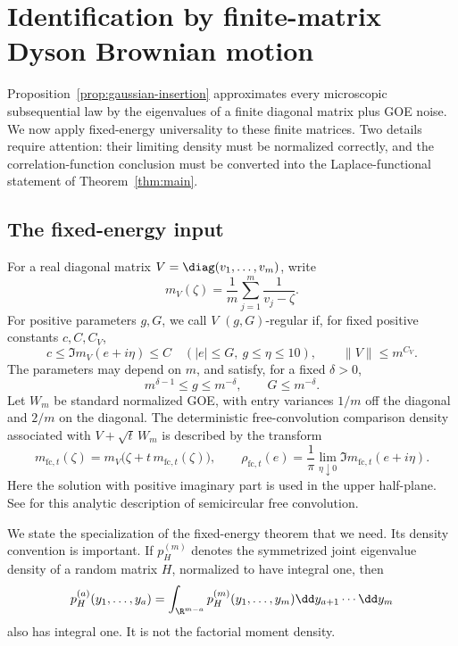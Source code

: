 \section{Identification by finite-matrix Dyson Brownian motion}
\label{sec:dbm}

Proposition~\ref{prop:gaussian-insertion} approximates every microscopic
subsequential law by the eigenvalues of a finite diagonal matrix plus GOE
noise. We now apply fixed-energy universality to these finite matrices.
Two details require attention: their limiting density must be normalized
correctly, and the correlation-function conclusion must be converted into
the Laplace-functional statement of Theorem~\ref{thm:main}.

\subsection{The fixed-energy input}

For a real diagonal matrix \(V=\diag(v_1,\ldots,v_m)\), write
\[
 m_V(\zeta)=\frac1m\sum_{j=1}^m\frac1{v_j-\zeta}.
\]
For positive parameters \(g,G\), we call \(V\) \((g,G)\)-regular
if, for fixed positive constants
\(c,C,C_V\),
\begin{equation}
 \label{eq:dbm-regularity}
 c\le \Im m_V(e+i\eta)\le C
 \quad (|e|\le G,\ g\le\eta\le10),
 \qquad \|V\|\le m^{C_V}.
\end{equation}
The parameters may depend on \(m\), and satisfy, for a fixed
\(\delta>0\),
\begin{equation}
 \label{eq:dbm-parameter-domain}
 m^{\delta-1}\le g\le m^{-\delta},
 \qquad G\le m^{-\delta}.
\end{equation}
Let \(W_m\) be standard normalized GOE, with entry variances \(1/m\)
off the diagonal and \(2/m\) on the diagonal. The deterministic
free-convolution comparison density associated with
\(V+\sqrt t\,W_m\) is described by the transform
\begin{equation}
 \label{eq:dbm-free-convolution}
 m_{\mathrm{fc},t}(\zeta)
   =m_V\bigl(\zeta+t\,m_{\mathrm{fc},t}(\zeta)\bigr),
 \qquad
 \rho_{\mathrm{fc},t}(e)
   =\frac1\pi\lim_{\eta\downarrow0}
          \Im m_{\mathrm{fc},t}(e+i\eta).
\end{equation}
Here the solution with positive imaginary part is used in the upper
half-plane. See \citet[Lemma~4, Proposition~2, and Corollary~2]{Biane} for this analytic
description of semicircular free convolution.

We state the specialization of the fixed-energy theorem that we need.
Its density convention is important. If \(p_H^{(m)}\) denotes the
symmetrized joint eigenvalue density of a random matrix \(H\), normalized
to have integral one, then
\[
 p_H^{(a)}(y_1,\ldots,y_a)
   =\int_{\R^{m-a}}p_H^{(m)}(y_1,\ldots,y_m)
        \dd y_{a+1}\cdots\dd y_m
\]
also has integral one. It is not the factorial moment density.

